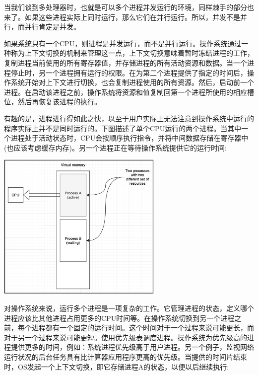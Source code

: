 当我们谈到多处理器时，也就是可以多个进程并发运行的环境，同样棘手的部分也来了。如果这些进程实际上同时运行，那么它们在并行运行。所以，并发不是并行，而并行肯定是并发。 \par
如果系统只有一个CPU，则进程是并发运行，而不是并行运行。操作系统通过一种称为上下文切换的机制来管理这一点，上下文切换意味着暂时冻结进程的工作，复制进程当前使用的所有寄存器值，并存储进程的所有活动资源和数据。当一个进程停止时，另一个进程拥有运行的权限。在为第二个进程提供了指定的时间后，操作系统开始对上下文进行切换，也会复制进程使用的所有资源。然后，启动前一个进程。在启动该进程之前，操作系统将资源和值复制回第一个进程所使用的相应槽位，然后再恢复该进程的执行。 \par
有趣的是，进程进行得如此之快，以至于用户实际上无法注意到操作系统中运行的程序实际上并不是同时运行的。下图描述了单个CPU运行的两个进程。当其中一个进程处于活动状态时，CPU会按顺序执行指令，并将中间数据存储在寄存器中(也应该考虑缓存内存)。另一个进程正在等待操作系统提供它的运行时间: \par

\begin{center}
	\includegraphics[width=0.6\textwidth]{content/Section-2/Chapter-8/3}
\end{center}

对操作系统来说，运行多个进程是一项复杂的工作。它管理进程的状态，定义哪个进程应该比其他进程占用更多的CPU时间等。在操作系统切换到另一个进程之前，每个进程都有一个固定的运行时间。这个时间对于一个过程来说可能更长，而对于另一个过程来说可能更短。使用优先级表调度进程。操作系统为优先级高的进程提供更多的时间，例如：系统进程优先级高于用户进程。另一个例子，监视网络运行状况的后台任务具有比计算器应用程序更高的优先级。当提供的时间片结束时，OS发起一个上下文切换，即它存储进程A的状态，以便以后继续执行: \par

